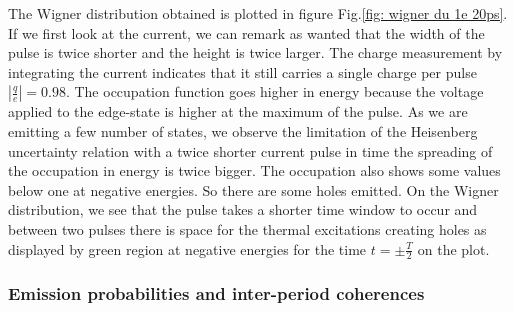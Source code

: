 The Wigner distribution obtained is plotted in figure Fig.\ref{fig: wigner du 1e 20ps}.
If we first look at the current, we can remark as wanted that the width of the pulse is twice shorter and the height is twice larger.
The charge measurement by integrating the current indicates that it still carries a single charge per pulse $\left|\frac{q}{e}\right| = 0.98$.
The occupation function goes higher in energy because the voltage applied to the edge-state is higher at the maximum of the pulse.
As we are emitting a few number of states, we observe the limitation of the Heisenberg uncertainty relation \cite{heisenberg1949physical} with a twice shorter current pulse in time the spreading of the occupation in energy is twice bigger.
The occupation also shows some values below one at negative energies.
So there are some holes emitted.
On the Wigner distribution, we see that the pulse takes a shorter time window to occur and between two pulses there is space for the thermal excitations creating holes as displayed by green region at negative energies for the time $t = \pm \frac{T}{2}$ on the plot.

\subsubsection*{Emission probabilities and inter-period coherences}

